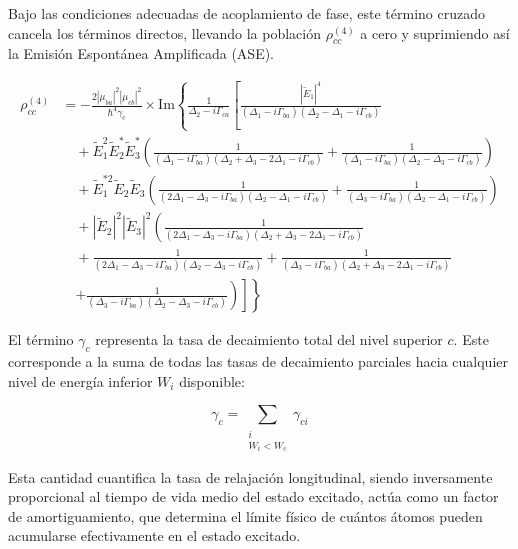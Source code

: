 \documentclass[12pt,a4paper]{article}
\begin{document}
Bajo las condiciones adecuadas de acoplamiento de fase, este término cruzado cancela los términos directos, llevando la población $\rho_{cc}^{(4)}$ a cero y suprimiendo así la Emisión Espontánea Amplificada (ASE).

\begin{equation}
\begin{aligned}
\rho_{cc}^{(4)} &= -\frac{2|\mu_{ba}|^2 |\mu_{cb}|^2}{\hbar^4 \gamma_c} \times \text{Im} \left\{ \frac{1}{\Delta_2 - i\Gamma_{ca}} \left[ \frac{|\tilde{E}_1|^4}{(\Delta_1 - i\Gamma_{ba})(\Delta_2 - \Delta_1 - i\Gamma_{cb})} \right. \right. \\
&\quad + \tilde{E}_1^2 \tilde{E}_2^* \tilde{E}_3^* \left( \frac{1}{(\Delta_1 - i\Gamma_{ba})(\Delta_2 + \Delta_3 - 2\Delta_1 - i\Gamma_{cb})} + \frac{1}{(\Delta_1 - i\Gamma_{ba})(\Delta_2 - \Delta_3 - i\Gamma_{cb})} \right) \\
&\quad + \tilde{E}_1^{*2} \tilde{E}_2 \tilde{E}_3 \left( \frac{1}{(2\Delta_1 - \Delta_3 - i\Gamma_{ba})(\Delta_2 - \Delta_1 - i\Gamma_{cb})} + \frac{1}{(\Delta_3 - i\Gamma_{ba})(\Delta_2 - \Delta_1 - i\Gamma_{cb})} \right) \\
&\quad + |\tilde{E}_2|^2 |\tilde{E}_3|^2 \left( \frac{1}{(2\Delta_1 - \Delta_3 - i\Gamma_{ba})(\Delta_2 + \Delta_3 - 2\Delta_1 - i\Gamma_{cb})} \right. \\
&\quad + \frac{1}{(2\Delta_1 - \Delta_3 - i\Gamma_{ba})(\Delta_2 - \Delta_3 - i\Gamma_{cb})} + \frac{1}{(\Delta_3 - i\Gamma_{ba})(\Delta_2 + \Delta_3 - 2\Delta_1 - i\Gamma_{cb})} \\
&\quad \left. \left. \left. + \frac{1}{(\Delta_3 - i\Gamma_{ba})(\Delta_2 - \Delta_3 - i\Gamma_{cb})} \right) \right] \right\}
\end{aligned} \tag{5}
\end{equation}

El término $\gamma_c$ representa la tasa de decaimiento total del nivel superior $c$. Este corresponde a la suma de todas las tasas de decaimiento parciales hacia cualquier nivel de energía inferior $W_i$ disponible: 

\begin{equation}
    \gamma_c = \sum_{\substack{i \\ W_i < W_c}} \gamma_{ci}
\end{equation}

Esta cantidad cuantifica la tasa de relajación longitudinal, siendo inversamente proporcional al tiempo de vida medio del estado excitado, actúa como un factor de amortiguamiento, que determina el límite físico de cuántos átomos pueden acumularse efectivamente en el estado excitado.
\end{document}
